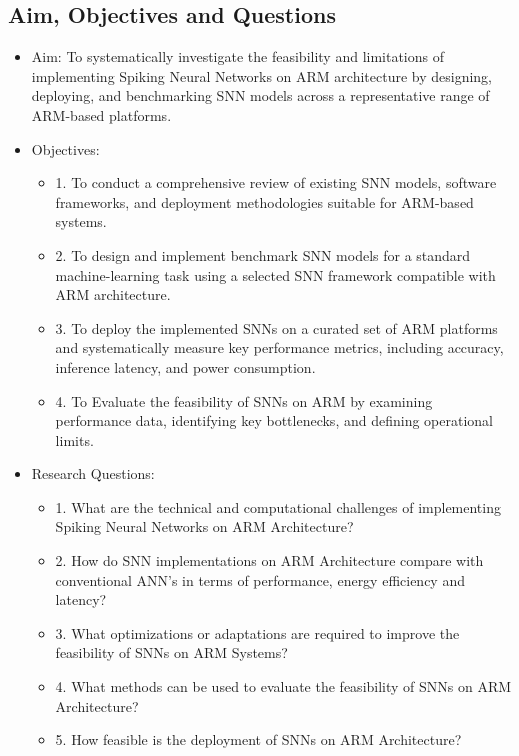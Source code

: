 \subsection{Aim, Objectives and Questions}

\begin{itemize}
	\item Aim: To systematically investigate the feasibility and limitations of implementing Spiking Neural Networks on ARM architecture by designing, deploying, and benchmarking SNN models across a representative range of ARM-based platforms.
	
	\item Objectives:
	\begin{itemize}
		\item 1. To conduct a comprehensive review of existing SNN models, software frameworks, and deployment methodologies suitable for ARM-based systems.
		
		\item 2. To design and implement benchmark SNN models for a standard machine-learning task using a selected SNN framework compatible with ARM architecture.
		
		\item 3. To deploy the implemented SNNs on a curated set of ARM platforms and systematically measure key performance metrics, including accuracy, inference latency, and power  consumption.
		
		\item 4. To Evaluate the feasibility of SNNs on ARM by examining performance data, identifying key bottlenecks, and defining operational limits.
	\end{itemize} 
	\item Research Questions:
	\begin{itemize}
		\item 1. What are the technical and computational challenges of implementing Spiking Neural Networks on ARM Architecture?
		\item 2. How do SNN implementations on ARM Architecture compare with conventional ANN's in terms of performance, energy efficiency and latency?
		\item 3. What optimizations or adaptations are required to improve the feasibility of SNNs on ARM Systems?
		\item 4. What methods can be used to evaluate the feasibility of SNNs on ARM Architecture?
		\item 5. How feasible is the deployment of SNNs on ARM Architecture?
	\end{itemize}
\end{itemize}

